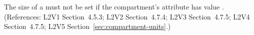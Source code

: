 The size of a \Compartment must not be set if the compartment's
 attribute has value . (References: L2V1
Section~4.5.3; L2V2 Section~4.7.4; L2V3 Section~4.7.5; L2V4 Section~4.7.5; L2V5 Section~\ref{sec:compartment-units}.)

